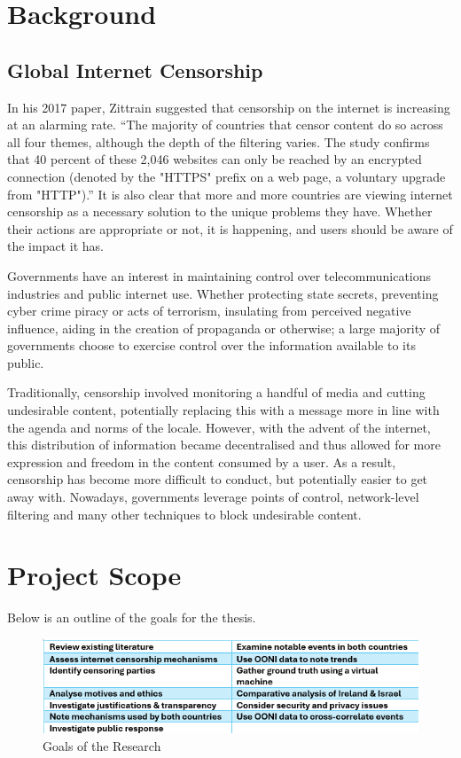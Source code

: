 \section{Background}
\subsection{Global Internet Censorship}
In his 2017 paper, \cite{Zittrain2017Censorship} Zittrain suggested that censorship on the internet is increasing at an alarming rate. “The majority of countries that censor content do so across all four themes, although the depth of the filtering varies. The study confirms that 40 percent of these 2,046 websites can only be reached by an encrypted connection (denoted by the "HTTPS" prefix on a web page, a voluntary upgrade from "HTTP").” \cite{Zittrain2017Censorship} It is also clear that more and more countries are viewing internet censorship as a necessary solution to the unique problems they have. Whether their actions are appropriate or not, it is happening, and users should be aware of the impact it has. 

Governments have an interest in maintaining control over telecommunications industries and public internet use. Whether protecting state secrets, preventing cyber crime piracy or acts of terrorism, insulating from perceived negative influence, aiding in the creation of propaganda or otherwise; a large majority of governments choose to exercise control over the information available to its public.  

Traditionally, censorship involved monitoring a handful of media and cutting undesirable content, potentially replacing this with a message more in line with the agenda and norms of the locale. However, with the advent of the internet, this distribution of information became decentralised and thus allowed for more expression and freedom in the content consumed by a user. As a result, censorship has become more difficult to conduct, but potentially easier to get away with. Nowadays, governments leverage points of control, network-level filtering and many other techniques to block undesirable content.


\section{Project Scope}
Below is an outline of the goals for the thesis. 

\begin{figure} [H]
    \centering
    \includegraphics[width=0.5\linewidth]{Research Goals.png}
    \caption{Goals of the Research}
    \label{fig:enter-label}
\end{figure}
